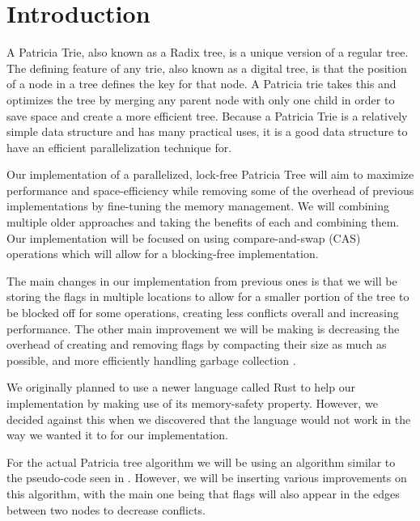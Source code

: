 \documentclass[conference]{IEEEtran}
\begin{document}
\section{Introduction}
A Patricia Trie, also known as a Radix tree, is a unique version of a regular tree. The defining feature of any trie, also known as a digital tree, is that the position of a node in a tree defines the key for that node. A Patricia trie takes this and optimizes the tree by merging any parent node with only one child in order to save space and create a more efficient tree.\cite{Shafiei2013} Because a Patricia Trie is a relatively simple data structure and has many practical uses, it is a good data structure to have an efficient parallelization technique for.
\par
Our implementation of a parallelized, lock-free Patricia Tree will aim to maximize performance and space-efficiency while removing some of the overhead of previous implementations by fine-tuning the memory management. We will combining multiple older approaches and taking the benefits of each and combining them. Our implementation will be focused on using compare-and-swap (CAS) operations which will allow for a blocking-free implementation. \cite{Shafiei2013,Brown2014}
\par
The main changes in our implementation from previous ones is that we will be storing the flags in multiple locations to allow for a smaller portion of the tree to be blocked off for some operations, creating less conflicts overall and increasing performance. \cite{Natarajan2014} The other main improvement we will be making is decreasing the overhead of creating and removing flags by compacting their size as much as possible, and more efficiently handling garbage collection .
\par
We originally planned to use a newer language called Rust to help our implementation by making use of its memory-safety property. However, we decided against this when we discovered that the language would not work in the way we wanted it to for our implementation.
\par
For the actual Patricia tree algorithm we will be using an algorithm similar to the pseudo-code seen in \cite{Shafiei2013}. However, we will be inserting various improvements on this algorithm, with the main one being that flags will also appear in the edges between two nodes to decrease conflicts. \cite{Natarajan2014}
\end{document}
